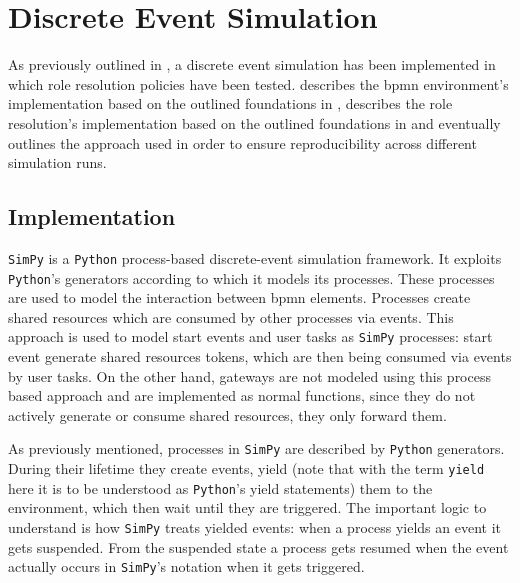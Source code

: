 \chapter{Discrete Event Simulation}
\label{ch:discrete_event_sim}

As previously outlined in , a discrete event simulation has been implemented in which role resolution policies have been tested.  describes the \gls{bpmn} environment's implementation based on the outlined foundations in ,  describes the role resolution's implementation based on the outlined foundations in  and eventually  outlines the approach used in order to ensure reproducibility across different simulation runs.

\section{ Implementation}
\label{sec:bpmn_implementation}

\texttt{SimPy} is a \texttt{Python} process-based discrete-event simulation framework. It exploits \texttt{Python}'s generators according to which it models its processes. These processes are used to model the interaction between \gls{bpmn} elements. Processes create shared resources which are consumed by other processes via events. This approach is used to model start events and user tasks as \texttt{SimPy} processes: start event generate shared resources \ie tokens, which are then being consumed via events by user tasks. On the other hand, gateways are not modeled using this process based approach and are implemented as normal functions, since they do not actively generate or consume shared resources, they only forward them.

As previously mentioned, processes in \texttt{SimPy} are described by \texttt{Python} generators. During their lifetime they create events, yield (note that with the term \texttt{yield} here it is to be understood as \texttt{Python}'s yield statements) them to the environment, which then wait until they are triggered. The important logic to understand is how \texttt{SimPy} treats yielded events: when a process yields an event it gets suspended. From the suspended state a process gets resumed when the event actually occurs \ie in \texttt{SimPy}'s notation when it gets triggered.

